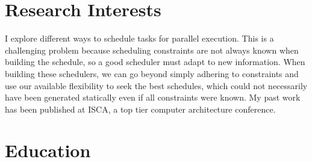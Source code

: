 \documentclass[11pt,a4paper,sans]{moderncv}        %
\begin{document}
\makecvtitle
\section{Research Interests}
I explore different ways to schedule tasks for parallel execution.  This is a challenging problem because scheduling constraints
are not always known when building the schedule, so a good scheduler must adapt to new information.  When building these schedulers,
we can go beyond simply adhering to constraints and use our available flexibility to seek the best schedules, which could not necessarily
have been generated statically even if all constraints were known.  My past work has been published at ISCA, a top tier computer architecture
conference.

\section{Education}

\nocite{posluns2022scalable}

                        
\end{document}
